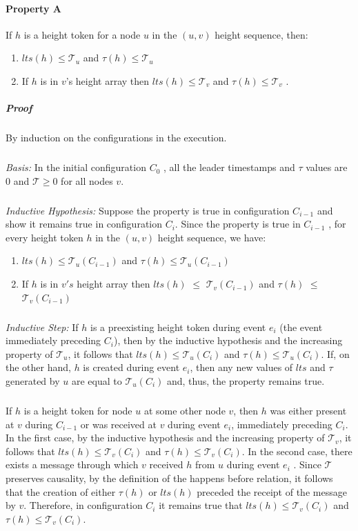 \paragraph{Property A}If $h$ is a height token for a node $u$ in the $(u, v)$ height sequence, then:
\begin{enumerate}
	\item $lts(h) \leq \mathcal{T} _u$ and $\tau (h) \leq \mathcal{T} _u$
	\item If $h$ is in $v$'s height array then $lts(h) \leq \mathcal{T} _v$ and $\tau (h) \leq \mathcal{T} _v$ .
\end{enumerate}
\newpage

\subparagraph{Proof}By induction on the configurations in the execution.
\subparagraph{}\textit{Basis:} In the initial configuration $C_0$ , all the leader timestamps and $\tau$ values are $0$ and $\mathcal{T} \geq 0$ for all nodes $v$.
\subparagraph{}\textit{Inductive Hypothesis:} Suppose the property is true in configuration $C_{i-1}$ and show it remains true in configuration $C_i$. Since the property is true in $C_{i-1}$ , for every height token $h$ in the $(u, v)$ height sequence, we have:
\begin{enumerate} [label=(\roman*)]
	\item $lts(h) \leq \mathcal{T} _u(C_{i-1})$ and $\tau (h) \leq \mathcal{T} _u(C_{i-1})$
	\item If $h$ is in $v's$ height array then $lts(h)$ $\leq$ $\mathcal{T} _v(C_{i-1})$ and $\tau (h)$ $\leq$ $\mathcal{T} _v (C_{i-1})$
\end{enumerate}
\subparagraph{}\textit{Inductive Step:} If $h$ is a preexisting height token during event $e_i$ (the event immediately preceding $C_i$), then by the inductive hypothesis and the increasing property of $\mathcal{T} _u$, it follows that $lts(h) \leq \mathcal{T} _u (C_i)$ and $\tau (h) \leq \mathcal{T} _u(C_i)$. If, on the other hand, $h$ is created during event $e_i$, then any new values of $lts$ and $\tau$ generated by $u$ are equal to $\mathcal{T} _u(C_i)$ and, thus, the property remains true.
\subparagraph{}If $h$ is a height token for node $u$ at some other node $v$, then $h$ was either present at $v$ during $C_{i-1}$ or was received at $v$ during event $e_i$, immediately preceding $C_i$. In the first case, by the inductive hypothesis and the increasing property of $\mathcal{T} _v$, it follows that $lts(h) \leq \mathcal{T} _v (C_i)$ and $\tau (h) \leq \mathcal{T} _v (C_i)$. In the second case, there exists a message through which $v$ received $h$ from $u$ during event $e_i$ . Since $\mathcal{T}$ preserves causality, by the definition of the happens before relation, it follows that the creation of either $\tau (h)$ or $lts(h)$ preceded the receipt of the message by $v$. Therefore, in configuration $C_i$ it remains true that $lts(h) \leq \mathcal{T} _v (C_i)$ and $\tau (h) \leq \mathcal{T} _v (C_i)$.
